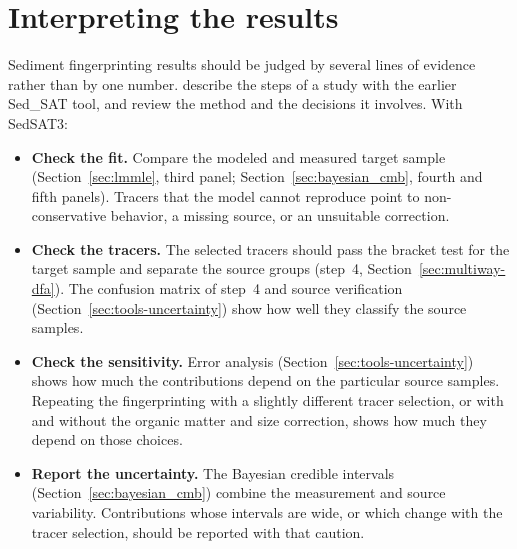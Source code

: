 \documentclass[12pt]{report}
\begin{document}
\section{Interpreting the results}\label{sec:interpretation}
Sediment fingerprinting results should be judged by several lines of evidence rather than by one number. \citet{gormansanisaca2017determining} describe the steps of a study with the earlier Sed\_SAT tool, and \citet{collins2017sediment} review the method and the decisions it involves. With SedSAT3:
\begin{itemize}
    \item \textbf{Check the fit.} Compare the modeled and measured target sample (Section~\ref{sec:lmmle}, third panel; Section~\ref{sec:bayesian_cmb}, fourth and fifth panels). Tracers that the model cannot reproduce point to non-conservative behavior, a missing source, or an unsuitable correction.
    \item \textbf{Check the tracers.} The selected tracers should pass the bracket test for the target sample and separate the source groups (step~4, Section~\ref{sec:multiway-dfa}). The confusion matrix of step~4 and source verification (Section~\ref{sec:tools-uncertainty}) show how well they classify the source samples.
    \item \textbf{Check the sensitivity.} Error analysis (Section~\ref{sec:tools-uncertainty}) shows how much the contributions depend on the particular source samples. Repeating the fingerprinting with a slightly different tracer selection, or with and without the organic matter and size correction, shows how much they depend on those choices.
    \item \textbf{Report the uncertainty.} The Bayesian credible intervals (Section~\ref{sec:bayesian_cmb}) combine the measurement and source variability. Contributions whose intervals are wide, or which change with the tracer selection, should be reported with that caution.
\end{itemize}
\end{document}
